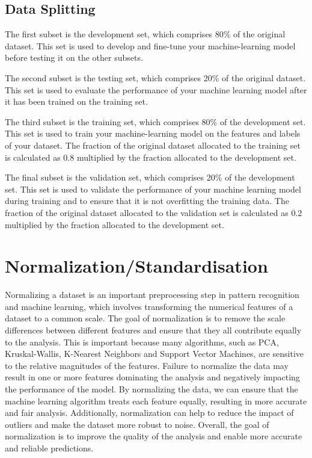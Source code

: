 \documentclass[12pt, a4paper]{article}
\begin{document}
\subsection{Data Splitting}

The first subset is the development set, which comprises 80\% of the original dataset. This set is used to develop and fine-tune your machine-learning model before testing it on the other subsets.

The second subset is the testing set, which comprises 20\% of the original dataset. This set is used to evaluate the performance of your machine learning model after it has been trained on the training set.

The third subset is the training set, which comprises 80\% of the development set. This set is used to train your machine-learning model on the features and labels of your dataset. The fraction of the original dataset allocated to the training set is calculated as 0.8 multiplied by the fraction allocated to the development set.

The final subset is the validation set, which comprises 20\% of the development set. This set is used to validate the performance of your machine learning model during training and to ensure that it is not overfitting the training data. The fraction of the original dataset allocated to the validation set is calculated as 0.2 multiplied by the fraction allocated to the development set.

\section{Normalization/Standardisation}
Normalizing a dataset is an important preprocessing step in pattern recognition and machine learning, which involves transforming the numerical features of a dataset to a common scale. The goal of normalization is to remove the scale differences between different features and ensure that they all contribute equally to the analysis. This is important because many algorithms, such as PCA, Kruskal-Wallis, K-Nearest Neighbors and Support Vector Machines, are sensitive to the relative magnitudes of the features. Failure to normalize the data may result in one or more features dominating the analysis and negatively impacting the performance of the model. By normalizing the data, we can ensure that the machine learning algorithm treats each feature equally, resulting in more accurate and fair analysis. Additionally, normalization can help to reduce the impact of outliers and make the dataset more robust to noise. Overall, the goal of normalization is to improve the quality of the analysis and enable more accurate and reliable predictions.
\end{document}
